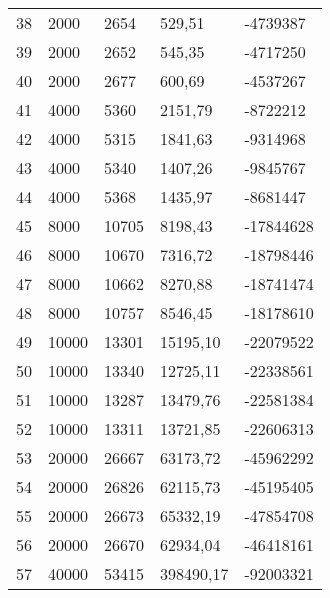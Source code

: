 \begin{longtable}{lllll}
    38               & 2000           & 2654           & 529,51      & -4739387        \\
    39               & 2000           & 2652           & 545,35      & -4717250        \\
    40               & 2000           & 2677           & 600,69      & -4537267        \\
    41               & 4000           & 5360           & 2151,79     & -8722212        \\
    42               & 4000           & 5315           & 1841,63     & -9314968        \\
    43               & 4000           & 5340           & 1407,26     & -9845767        \\
    44               & 4000           & 5368           & 1435,97     & -8681447        \\
    45               & 8000           & 10705          & 8198,43     & -17844628       \\
    46               & 8000           & 10670          & 7316,72     & -18798446       \\
    47               & 8000           & 10662          & 8270,88     & -18741474       \\
    48               & 8000           & 10757          & 8546,45     & -18178610       \\
    49               & 10000          & 13301          & 15195,10    & -22079522       \\
    50               & 10000          & 13340          & 12725,11    & -22338561       \\
    51               & 10000          & 13287          & 13479,76    & -22581384       \\
    52               & 10000          & 13311          & 13721,85    & -22606313       \\
    53               & 20000          & 26667          & 63173,72    & -45962292       \\
    54               & 20000          & 26826          & 62115,73    & -45195405       \\
    55               & 20000          & 26673          & 65332,19    & -47854708       \\
    56               & 20000          & 26670          & 62934,04    & -46418161       \\
    57               & 40000          & 53415          & 398490,17   & -92003321       \\

\end{longtable}
